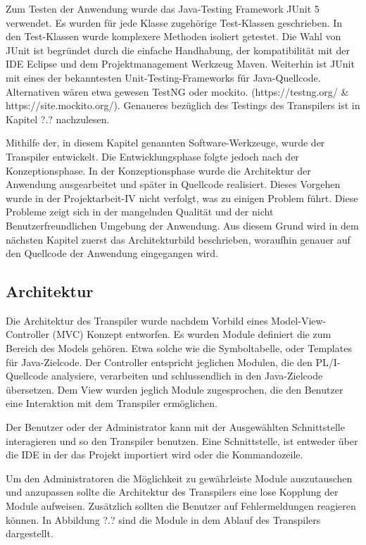 
Zum Testen der Anwendung wurde das Java-Testing Framework JUnit 5 verwendet. Es wurden für jede Klasse zugehörige Test-Klassen geschrieben. In den Test-Klassen wurde komplexere Methoden isoliert getestet.
Die Wahl von JUnit ist begründet durch die einfache Handhabung, der kompatibilität mit der IDE Eclipse und dem Projektmanagement Werkzeug Maven. Weiterhin ist JUnit mit eines der bekanntesten Unit-Testing-Frameworks für Java-Quellcode. Alternativen wären etwa gewesen TestNG oder mockito. (https://testng.org/ & https://site.mockito.org/).
Genaueres bezüglich des Testings des Transpilers ist in Kapitel ?.? nachzulesen.


Mithilfe der, in diesem Kapitel genannten Software-Werkzeuge, wurde der Transpiler entwickelt. Die Entwicklungsphase folgte jedoch nach der Konzeptionsphase.
In der Konzeptionsphase wurde die Architektur der Anwendung ausgearbeitet und später in Quellcode realisiert. 
Dieses Vorgehen wurde in der Projektarbeit-IV nicht verfolgt, was zu einigen Problem führt. Diese Probleme zeigt sich in der mangelnden Qualität und der nicht Benutzerfreundlichen Umgebung der Anwendung.
Aus diesem Grund wird in dem nächsten Kapitel zuerst das Architekturbild beschrieben, woraufhin genauer auf den Quellcode der Anwendung eingegangen wird.

\subsection{Architektur} 

Die Architektur des Transpiler wurde nachdem Vorbild eines Model-View-Controller (MVC) Konzept entworfen. 
Es wurden Module definiert die zum Bereich des Models gehören. Etwa solche wie die Symboltabelle, oder Templates für Java-Zielcode.
Der Controller entspricht jeglichen Modulen, die den PL/I-Quellcode analysiere, verarbeiten und schlussendlich in den Java-Zielcode übersetzen.
Dem View wurden jeglich Module zugesprochen, die den Benutzer eine Interaktion mit dem Transpiler ermöglichen.

Der Benutzer oder der Administrator kann mit der Ausgewählten Schnittstelle interagieren und so den Transpiler benutzen. Eine Schnittstelle, ist entweder über die IDE in 
der das Projekt importiert wird oder die Kommandozeile.

Um den Administratoren die Möglichkeit zu gewährleiste Module auszutauschen und anzupassen sollte die Architektur des Transpilers eine lose Kopplung der Module aufweisen.
Zusätzlich sollten die Benutzer auf Fehlermeldungen reagieren können.
In Abbildung ?.? sind die Module in dem Ablauf des Transpilers dargestellt.

